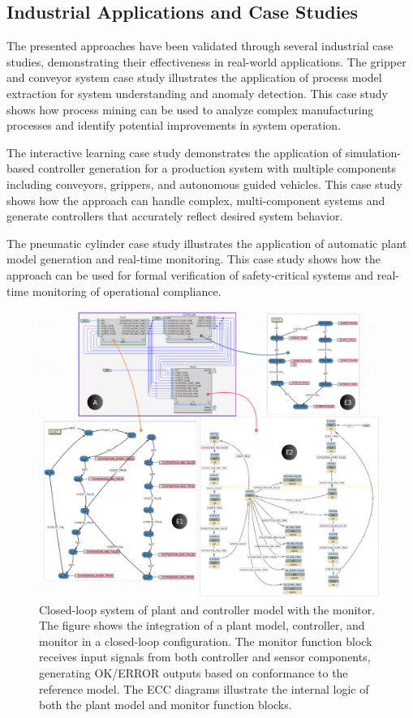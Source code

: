 \subsection{Industrial Applications and Case Studies}

The presented approaches have been validated through several industrial case studies, demonstrating their effectiveness in real-world applications. The gripper and conveyor system case study illustrates the application of process model extraction for system understanding and anomaly detection. This case study shows how process mining can be used to analyze complex manufacturing processes and identify potential improvements in system operation.

The interactive learning case study demonstrates the application of simulation-based controller generation for a production system with multiple components including conveyors, grippers, and autonomous guided vehicles. This case study shows how the approach can handle complex, multi-component systems and generate controllers that accurately reflect desired system behavior.

The pneumatic cylinder case study illustrates the application of automatic plant model generation and real-time monitoring. This case study shows how the approach can be used for formal verification of safety-critical systems and real-time monitoring of operational compliance.

\begin{figure}[!t]
	\centering
	\includegraphics[width=1\textwidth]{chapters/images/chapter4/CLMC.PNG}
	\caption{Closed-loop system of plant and controller model with the monitor. The figure shows the integration of a plant model, controller, and monitor in a closed-loop configuration. The monitor function block receives input signals from both controller and sensor components, generating OK/ERROR outputs based on conformance to the reference model. The ECC diagrams illustrate the internal logic of both the plant model and monitor function blocks.}
	\label{CL_plant_controller_monitor}
\end{figure}

